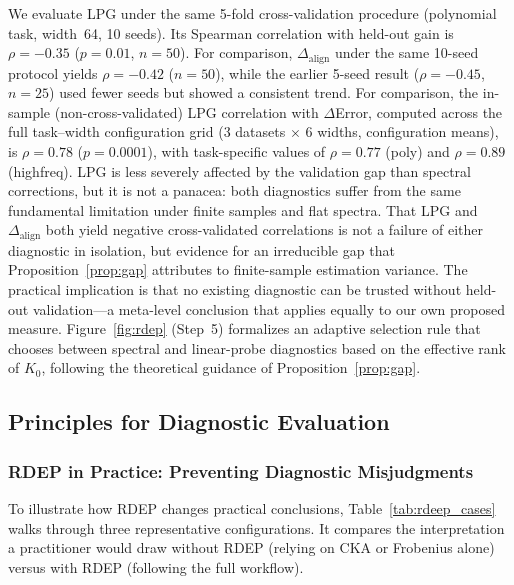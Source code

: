 \documentclass[twoside,11pt]{article}
\begin{document}
We evaluate LPG under the same 5-fold cross-validation procedure (polynomial task, width~64, 10 seeds). Its Spearman correlation with held-out gain is $\rho=-0.35$ ($p=0.01$, $n=50$). For comparison, $\Delta_{\text{align}}$ under the same 10-seed protocol yields $\rho=-0.42$ ($n=50$), while the earlier 5-seed result ($\rho=-0.45$, $n=25$) used fewer seeds but showed a consistent trend. For comparison, the in-sample (non-cross-validated) LPG correlation with $\Delta$Error, computed across the full task--width configuration grid (3 datasets $\times$ 6 widths, configuration means), is $\rho=0.78$ ($p=0.0001$), with task-specific values of $\rho=0.77$ (poly) and $\rho=0.89$ (highfreq). LPG is less severely affected by the validation gap than spectral corrections, but it is not a panacea: both diagnostics suffer from the same fundamental limitation under finite samples and flat spectra. That LPG and $\Delta_{\text{align}}$ both yield negative cross-validated correlations is not a failure of either diagnostic in isolation, but evidence for an irreducible gap that Proposition~\ref{prop:gap} attributes to finite-sample estimation variance. The practical implication is that no existing diagnostic can be trusted without held-out validation---a meta-level conclusion that applies equally to our own proposed measure. Figure~\ref{fig:rdep} (Step~5) formalizes an adaptive selection rule that chooses between spectral and linear-probe diagnostics based on the effective rank of $K_0$, following the theoretical guidance of Proposition~\ref{prop:gap}.

\vspace{4pt}
\subsection{Principles for Diagnostic Evaluation}\label{sec:principles}
\vspace{2pt}

\subsubsection{RDEP in Practice: Preventing Diagnostic Misjudgments}

To illustrate how RDEP changes practical conclusions, Table~\ref{tab:rdeep_cases} walks through three representative configurations. It compares the interpretation a practitioner would draw without RDEP (relying on CKA or Frobenius alone) versus with RDEP (following the full workflow).
\end{document}
